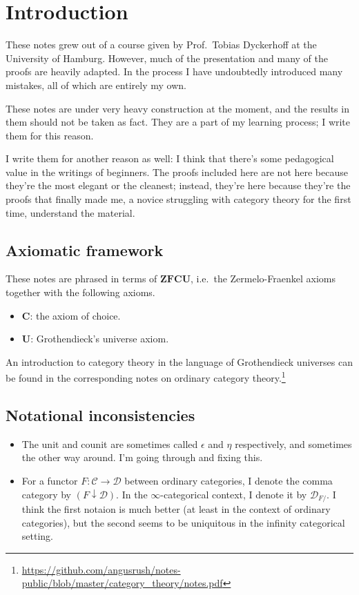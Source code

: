 \documentclass[main.tex]{subfiles}
\begin{document}
\chapter{Introduction}
\label{ch:introduction}

These notes grew out of a course given by Prof.\ Tobias Dyckerhoff at the University of Hamburg. However, much of the presentation and many of the proofs are heavily adapted. In the process I have undoubtedly introduced many mistakes, all of which are entirely my own.

These notes are under very heavy construction at the moment, and the results in them should not be taken as fact. They are a part of my learning process; I write them for this reason.

I write them for another reason as well: I think that there's some pedagogical value in the writings of beginners. The proofs included here are not here because they're the most elegant or the cleanest; instead, they're here because they're the proofs that finally made me, a novice struggling with category theory for the first time, understand the material.

\section{Axiomatic framework}
\label{sec:axiomatic_framework}

These notes are phrased in terms of $\mathbf{ZFCU}$, i.e.\ the Zermelo-Fraenkel axioms together with the following axioms.
\begin{itemize}
  \item $\mathbf{C}$: the axiom of choice.

  \item $\mathbf{U}$: Grothendieck's universe axiom.
\end{itemize}

An introduction to category theory in the language of Grothendieck universes can be found in the corresponding notes on ordinary category theory.\footnote{\url{https://github.com/angusrush/notes-public/blob/master/category_theory/notes.pdf}}

\section{Notational inconsistencies}
\label{sec:notation}

\begin{itemize}
  \item The unit and counit are sometimes called $\epsilon$ and $\eta$ respectively, and sometimes the other way around. I'm going through and fixing this.

  \item For a functor $F\colon \mathcal{C} \to \mathcal{D}$ between ordinary categories, I denote the comma category by $(F \downarrow \mathcal{D})$. In the $\infty$-categorical context, I denote it by $\mathcal{D}_{F/}$. I think the first notaion is much better (at least in the context of ordinary categories), but the second seems to be uniquitous in the infinity categorical setting.
\end{itemize}
\end{document}
